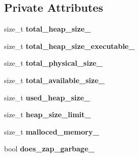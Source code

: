 \subsection*{Private Attributes}
\begin{DoxyCompactItemize}
\item 
size\+\_\+t {\bfseries total\+\_\+heap\+\_\+size\+\_\+}\hypertarget{classv8_1_1_heap_statistics_adefc5826610a3e23af67fa314df754f8}{}\label{classv8_1_1_heap_statistics_adefc5826610a3e23af67fa314df754f8}

\item 
size\+\_\+t {\bfseries total\+\_\+heap\+\_\+size\+\_\+executable\+\_\+}\hypertarget{classv8_1_1_heap_statistics_a31523d73f70a50db8080180843f37f9d}{}\label{classv8_1_1_heap_statistics_a31523d73f70a50db8080180843f37f9d}

\item 
size\+\_\+t {\bfseries total\+\_\+physical\+\_\+size\+\_\+}\hypertarget{classv8_1_1_heap_statistics_acd576e41e472c3780857e1c7bfbf67b6}{}\label{classv8_1_1_heap_statistics_acd576e41e472c3780857e1c7bfbf67b6}

\item 
size\+\_\+t {\bfseries total\+\_\+available\+\_\+size\+\_\+}\hypertarget{classv8_1_1_heap_statistics_a10e8873cb2b0d5b33911d475cececc38}{}\label{classv8_1_1_heap_statistics_a10e8873cb2b0d5b33911d475cececc38}

\item 
size\+\_\+t {\bfseries used\+\_\+heap\+\_\+size\+\_\+}\hypertarget{classv8_1_1_heap_statistics_aa705745c8980f3117b7db84480081fba}{}\label{classv8_1_1_heap_statistics_aa705745c8980f3117b7db84480081fba}

\item 
size\+\_\+t {\bfseries heap\+\_\+size\+\_\+limit\+\_\+}\hypertarget{classv8_1_1_heap_statistics_adaace0f2d63366bb8a6a9edc03b72b3f}{}\label{classv8_1_1_heap_statistics_adaace0f2d63366bb8a6a9edc03b72b3f}

\item 
size\+\_\+t {\bfseries malloced\+\_\+memory\+\_\+}\hypertarget{classv8_1_1_heap_statistics_a5b38e07c8cb2e22b280551e9681c6216}{}\label{classv8_1_1_heap_statistics_a5b38e07c8cb2e22b280551e9681c6216}

\item 
bool {\bfseries does\+\_\+zap\+\_\+garbage\+\_\+}\hypertarget{classv8_1_1_heap_statistics_a92da660f30e97f7fce759f13d43514ee}{}\label{classv8_1_1_heap_statistics_a92da660f30e97f7fce759f13d43514ee}

\end{DoxyCompactItemize}
